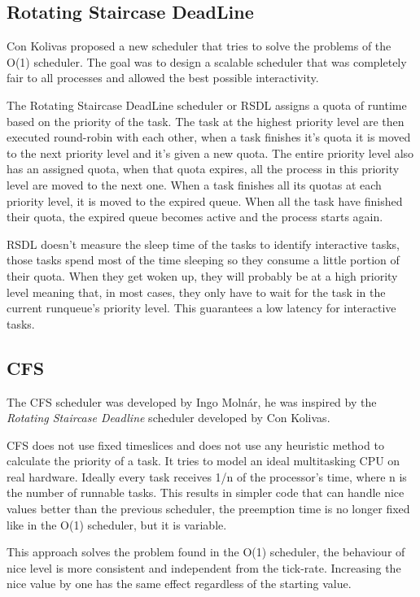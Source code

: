 \documentclass[10pt]{book}
\begin{document}
\subsection{Rotating Staircase DeadLine}
Con Kolivas proposed a new scheduler that tries to solve the problems of the O(1) scheduler. The goal was to design a scalable scheduler that was completely fair to all processes and allowed the best possible interactivity.

The Rotating Staircase DeadLine scheduler or RSDL assigns a quota of runtime based on the priority of the task. The task at the highest priority level are then executed round-robin with each other, when a task finishes it's quota it is moved to the next priority level and it's given a new quota. The entire priority level also has an assigned quota, when that quota expires, all the process in this priority level are moved to the next one. When a task finishes all its quotas at each priority level, it is moved to the expired queue. When all the task have finished their quota, the expired queue becomes active and the process starts again.

RSDL doesn't measure the sleep time of the tasks to identify interactive tasks, those tasks spend most of the time sleeping so they consume a little portion of their quota. When they get woken up, they will probably be at a high priority level meaning that, in most cases, they only have to wait for the task in the current runqueue's priority level. This guarantees a low latency for interactive tasks. 

\subsection{CFS}
The CFS scheduler was developed by Ingo Molnár, he was inspired by the \textit{Rotating Staircase Deadline} scheduler developed by Con Kolivas. 

CFS does not use fixed timeslices and does not use any heuristic method to calculate the priority of a task. It tries to model an ideal multitasking CPU on real hardware. Ideally every task receives 1/n of the processor's time, where n is the number of runnable tasks. This results in simpler code that can handle nice values better than the previous scheduler, the preemption time is no longer fixed like in the O(1) scheduler, but it is variable.

This approach solves the problem found in the O(1) scheduler, the behaviour of nice level is more consistent and independent from the tick-rate. Increasing the nice value by one has the same effect regardless of the starting value.
\end{document}
